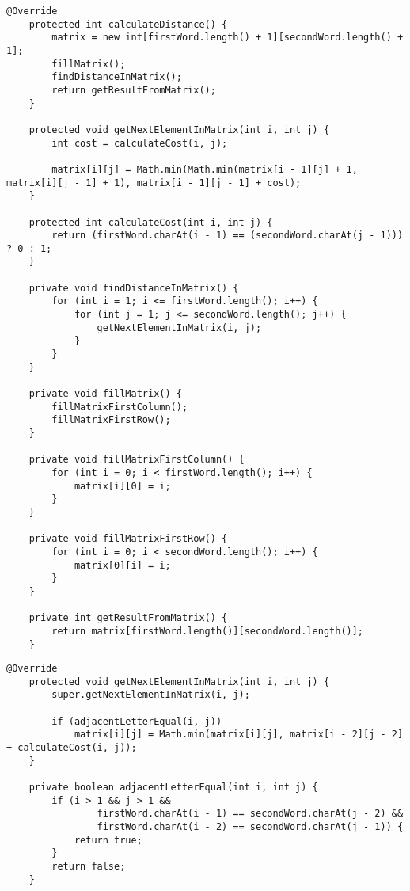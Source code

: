 ﻿\documentclass[12pt]{report}
\begin{document}
\begin{lstlisting}[label=some-code,caption=Класс нахождения расстояния Левенштейна матрично]
@Override
    protected int calculateDistance() {
        matrix = new int[firstWord.length() + 1][secondWord.length() + 1];
        fillMatrix();
        findDistanceInMatrix();
        return getResultFromMatrix();
    }

    protected void getNextElementInMatrix(int i, int j) {
        int cost = calculateCost(i, j);

        matrix[i][j] = Math.min(Math.min(matrix[i - 1][j] + 1, matrix[i][j - 1] + 1), matrix[i - 1][j - 1] + cost);
    }

    protected int calculateCost(int i, int j) {
        return (firstWord.charAt(i - 1) == (secondWord.charAt(j - 1))) ? 0 : 1;
    }

    private void findDistanceInMatrix() {
        for (int i = 1; i <= firstWord.length(); i++) {
            for (int j = 1; j <= secondWord.length(); j++) {
                getNextElementInMatrix(i, j);
            }
        }
    }

    private void fillMatrix() {
        fillMatrixFirstColumn();
        fillMatrixFirstRow();
    }

    private void fillMatrixFirstColumn() {
        for (int i = 0; i < firstWord.length(); i++) {
            matrix[i][0] = i;
        }
    }

    private void fillMatrixFirstRow() {
        for (int i = 0; i < secondWord.length(); i++) {
            matrix[0][i] = i;
        }
    }

    private int getResultFromMatrix() {
        return matrix[firstWord.length()][secondWord.length()];
    }
\end{lstlisting}

\begin{lstlisting}[label=some-code,caption=Класс нахождения расстояния Дамерау-Левенштейна матрично]
@Override
    protected void getNextElementInMatrix(int i, int j) {
        super.getNextElementInMatrix(i, j);

        if (adjacentLetterEqual(i, j))
            matrix[i][j] = Math.min(matrix[i][j], matrix[i - 2][j - 2] + calculateCost(i, j));
    }

    private boolean adjacentLetterEqual(int i, int j) {
        if (i > 1 && j > 1 &&
                firstWord.charAt(i - 1) == secondWord.charAt(j - 2) &&
                firstWord.charAt(i - 2) == secondWord.charAt(j - 1)) {
            return true;
        }
        return false;
    }
\end{lstlisting}
\end{document}
